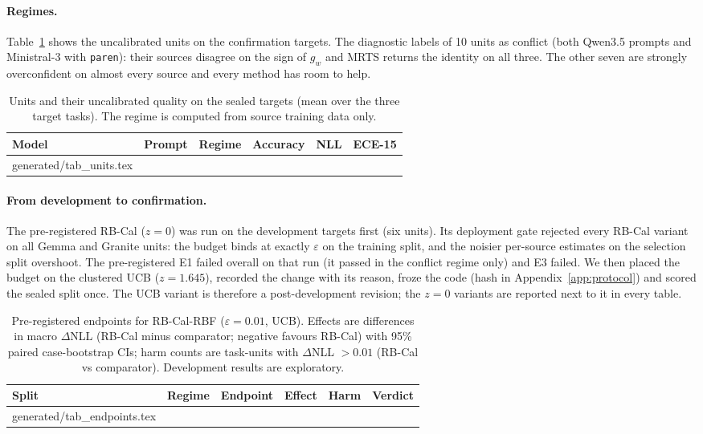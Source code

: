 \documentclass[11pt]{article}
\makeatletter
\theoremstyle{remark}
\newcommand{\inputtable}[1]{\@@input #1 }
\makeatother
\begin{document}
\paragraph{Regimes.}
Table~\ref{tab:units} shows the uncalibrated units on the confirmation targets.
The diagnostic labels \NConflictUnits{} of 10 units as conflict (both Qwen3.5 prompts and Ministral-3 with \texttt{paren}): their sources disagree on the sign of $g_w$ and MRTS returns the identity on all three.
The other seven are strongly overconfident on almost every source and every method has room to help.

\begin{table}[t]
\centering\small
\caption{Units and their uncalibrated quality on the sealed targets (mean over the three target tasks). The regime is computed from source training data only.}
\label{tab:units}
\begin{tabular}{llcccc}
\toprule
Model & Prompt & Regime & Accuracy & NLL & ECE-15\\
\midrule
\inputtable{generated/tab_units.tex}
\bottomrule
\end{tabular}
\end{table}

\paragraph{From development to confirmation.}
The pre-registered RB-Cal ($z=0$) was run on the development targets first (six units).
Its deployment gate rejected every RB-Cal variant on all Gemma and Granite units: the budget binds at exactly $\varepsilon$ on the training split, and the noisier per-source estimates on the selection split overshoot.
The pre-registered E1 failed overall on that run (it passed in the conflict regime only) and E3 failed.
We then placed the budget on the clustered UCB ($z=1.645$), recorded the change with its reason, froze the code (hash in Appendix~\ref{app:protocol}) and scored the sealed split once.
The UCB variant is therefore a post-development revision; the $z=0$ variants are reported next to it in every table.

\begin{table}[t]
\centering\small
\caption{Pre-registered endpoints for RB-Cal-RBF ($\varepsilon=0.01$, UCB). Effects are differences in macro $\Delta$NLL (RB-Cal minus comparator; negative favours RB-Cal) with 95\% paired case-bootstrap CIs; harm counts are task-units with $\Delta$NLL $>0.01$ (RB-Cal vs comparator). Development results are exploratory.}
\label{tab:endpoints}
\begin{tabular}{lllccc}
\toprule
Split & Regime & Endpoint & Effect & Harm & Verdict\\
\midrule
\inputtable{generated/tab_endpoints.tex}
\bottomrule
\end{tabular}
\end{table}
\end{document}
